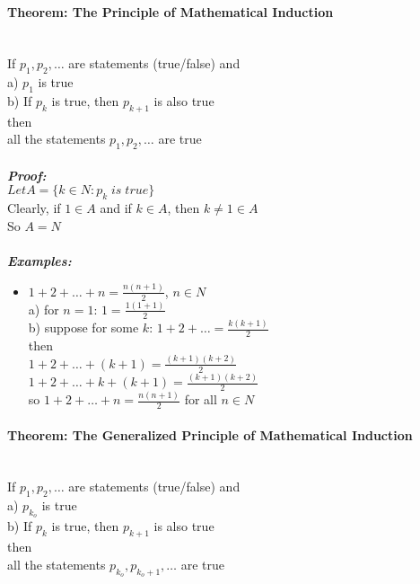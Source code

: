 \documentclass{article}
\begin{document}
\paragraph{Theorem: The Principle of Mathematical Induction}\mbox{} \\
If $p_1, p_2, \dots$ are statements (true/false) and\\
\indent a) $p_1$ is true\\
\indent b) If $p_k$ is true, then $p_{k+1}$ is also true\\
then\\
\indent all the statements $p_1, p_2, \dots$ are true\\
\\
\textbf{\textit{Proof:}}\\
$Let A = \{k \in N: p_k\;is\;true\}$\\
Clearly, if $1 \in A$ and if $k \in A$, then $k \neq 1 \in A$\\
So $A = N$\\
\\
\textbf{\textit{Examples:}}
\begin{itemize}
    \item $1 + 2 + \dots + n = \frac{n(n + 1)}{2}$, $n \in N$\\
    a) for $n = 1$: $1 = \frac{1(1 + 1)}{2}$\\
    b) suppose for some $k$: $1 + 2 + \dots = \frac{k(k+1)}{2}$\\
    then\\
    $1 + 2 + \dots + (k + 1) = \frac{(k+1)(k+2)}{2}$\\
    $1 + 2 + \dots + k + (k + 1) = \frac{(k+1)(k+2)}{2}$\\
    so
    $1 + 2 + \dots + n = \frac{n(n+1)}{2}$ for all $n \in N$\\
\end{itemize}

\paragraph{Theorem: The Generalized Principle of Mathematical Induction}\mbox{} \\
If $p_1, p_2, \dots$ are statements (true/false) and\\
\indent a) $p_{k_o}$ is true\\
\indent b) If $p_k$ is true, then $p_{k+1}$ is also true\\
then\\
\indent all the statements $p_{k_o}, p_{k_o+1}, \dots$ are true\\
\\
\end{document}
